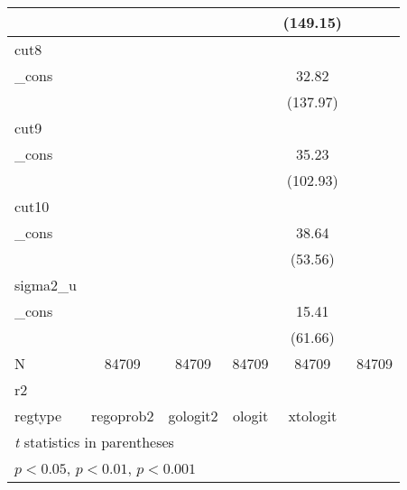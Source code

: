 {\begin{tabular}{l*{5}{c}}
            &                     &                     &                     &    (149.15)         &                     \\
\hline
cut8        &                     &                     &                     &                     &                     \\
\_cons      &                     &                     &                     &       32.82\sym{***}&                     \\
            &                     &                     &                     &    (137.97)         &                     \\
\hline
cut9        &                     &                     &                     &                     &                     \\
\_cons      &                     &                     &                     &       35.23\sym{***}&                     \\
            &                     &                     &                     &    (102.93)         &                     \\
\hline
cut10       &                     &                     &                     &                     &                     \\
\_cons      &                     &                     &                     &       38.64\sym{***}&                     \\
            &                     &                     &                     &     (53.56)         &                     \\
\hline
sigma2\_u    &                     &                     &                     &                     &                     \\
\_cons      &                     &                     &                     &       15.41\sym{***}&                     \\
            &                     &                     &                     &     (61.66)         &                     \\
\hline
N           &       84709         &       84709         &       84709         &       84709         &       84709         \\
r2          &                     &                     &                     &                     &                     \\
regtype     &   regoprob2         &    gologit2         &      ologit         &    xtologit         &                     \\
\hline\hline
\multicolumn{6}{l}{\footnotesize \textit{t} statistics in parentheses}\\
\multicolumn{6}{l}{\footnotesize \sym{*} \(p<0.05\), \sym{**} \(p<0.01\), \sym{***} \(p<0.001\)}\\
\end{tabular}
}
